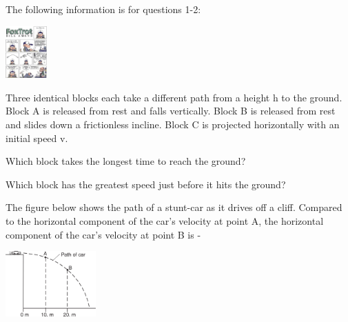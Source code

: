 \documentclass[10pt]{examdesign}
\begin{document}
\begin{multiplechoice} [title={Multiple Choice},
	rearrange=no]
	
\begin{block}
	The following information is for questions 1-2:
	
	
		\includegraphics[height=2cm]{foxtrot.jpg}
		
Three identical blocks each take a different path from a height h to the ground.  Block A is released from rest and falls vertically.  Block B is released from rest and slides down a frictionless incline.  Block C is projected horizontally with an initial speed v.  
	

\begin{question}
Which block takes the longest time to reach the ground?

	\end{question}

\begin{question}
Which block has the greatest speed just before it hits the ground?
	\end{question}



\end{block}

\begin{question}
The figure below shows the path of a stunt-car as it drives off a cliff.  Compared to the horizontal component of the car's velocity at point A, the horizontal component of the car's velocity at point B is - 

	\hspace{3in} \includegraphics[height=2.5cm]{car.png}
\vspace{-.7in}
\end{question}



\end{multiplechoice}
\end{document}
